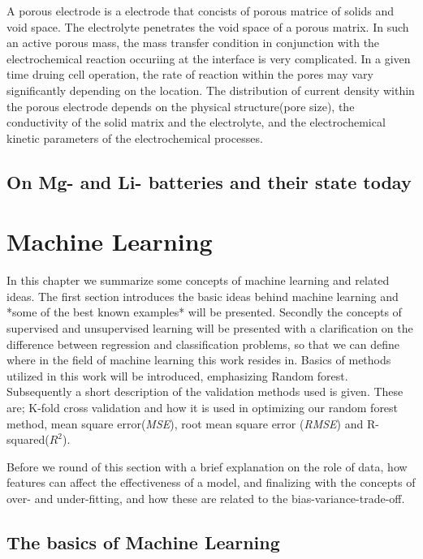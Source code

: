 	A porous electrode is a electrode that concists of porous matrice of solids and void space. The electrolyte penetrates the void space of a porous matrix. In such an active porous mass, the mass transfer condition in conjunction with the electrochemical reaction occuriing at the interface is very complicated. In a given time druing cell operation, the rate of reaction within the pores may vary significantly depending on the location. The distribution of current density within the porous electrode depends on the physical structure(pore size), the conductivity of the solid matrix and the electrolyte, and the electrochemical kinetic parameters of the electrochemical processes.  
	

\subsection{On Mg- and Li- batteries and their state today}
	
	
	
\pagebreak
\section{Machine Learning}

In this chapter we summarize some concepts of machine learning and related ideas. The first section introduces the basic ideas behind machine learning and *some of the best known examples* will be presented. Secondly the concepts of supervised and unsupervised learning will be presented with a clarification on the difference between regression and classification problems, so that we can define where in the field of machine learning this work resides in. Basics of methods utilized in this work will be introduced, emphasizing Random forest. Subsequently a short description of the validation methods used is given. These are; K-fold cross validation and how it is used in optimizing our random forest method, mean square error(\textit{MSE}), root mean square error (\textit{RMSE}) and R-squared($R^2$). 
   
Before we round of this section with a brief explanation on the role of data, how features can affect the effectiveness of a model, and finalizing with the concepts of over- and under-fitting, and how these are related to the bias-variance-trade-off. 




\subsection{The basics of Machine Learning}

